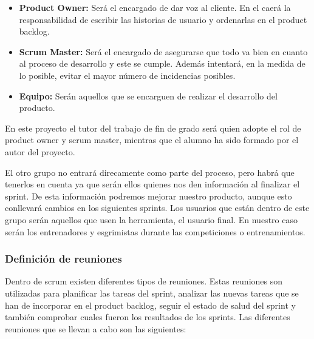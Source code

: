 \begin{itemize}
  \item \textbf{Product Owner:} Será el encargado de dar voz al cliente. En el caerá la
     responsabilidad de escribir las historias de usuario y ordenarlas en el product backlog.
   \item \textbf{Scrum Master:} Será el encargado de asegurarse que todo va bien en cuanto
      al proceso de desarrollo y este se cumple. Además intentará, en la medida de lo posible,
      evitar el mayor número de incidencias posibles.
   \item \textbf{Equipo:} Serán aquellos que se encarguen de realizar el desarrollo del producto.
\end{itemize}

En este proyecto el tutor del trabajo de fin de grado será quien adopte el rol de product owner
 y scrum master, mientras que el alumno ha sido formado por el autor del proyecto.

El otro grupo no entrará direcamente como parte del proceso, pero habrá que tenerlos en
 cuenta ya que serán ellos quienes nos den información al finalizar el sprint. De esta
 información podremos mejorar nuestro producto, aunque esto conllevará cambios en los
 siguientes sprints. Los usuarios que están dentro de este grupo serán aquellos que usen
 la herramienta, el usuario final. En nuestro caso serán los entrenadores y esgrimistas
 durante las competiciones o entrenamientos.

\subsubsection{Definición de reuniones}

Dentro de scrum existen diferentes tipos de reuniones. Estas reuniones son utilizadas para
 planificar las tareas del sprint, analizar las nuevas tareas que se han de incorporar en
 el product backlog, seguir el estado de salud del sprint y también comprobar cuales fueron
 los resultados de los sprints. Las diferentes reuniones que se llevan a cabo son las siguientes:


